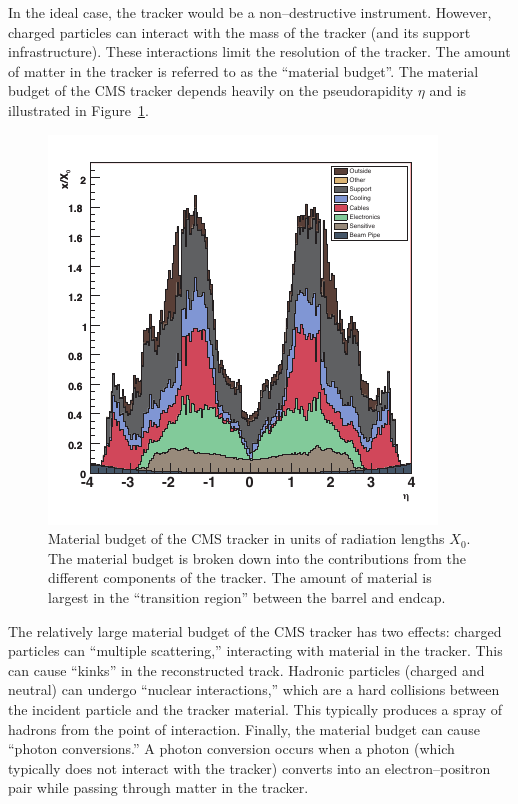 In the ideal case, the tracker would be a non--destructive instrument.  However,
charged particles can interact with the mass of the tracker (and its support
infrastructure).  These interactions limit the resolution of the tracker.  The
amount of matter in the tracker is referred to as the ``material budget''.  The
material budget of the CMS tracker depends heavily on the pseudorapidity $\eta$
and is illustrated in Figure~\ref{fig:TrackerMaterialBudget}.
\begin{figure}
  \centering
  \includegraphics[]{detector_chapter/figures/tracker_material_budget_cleaned.pdf}
  \caption[Material budget of the CMS tracker]{Material budget of the CMS
  tracker in units of radiation lengths $X_0$.  The material budget is broken down
  into the contributions from the different components of the tracker.  The
  amount of material is largest in the ``transition region'' between the barrel
  and endcap.  } \label{fig:TrackerMaterialBudget}
\end{figure}
The relatively large material budget of the CMS tracker has two effects: charged
particles can ``multiple scattering,'' interacting with material in the
tracker.  This can cause ``kinks'' in the reconstructed track.   Hadronic
particles (charged and neutral) can undergo ``nuclear interactions,'' which are
a hard collisions between the incident particle and the tracker material. This
typically produces a spray of hadrons from the point of interaction.  Finally,
the material budget can cause ``photon conversions.''  A photon conversion
occurs when a photon (which typically does not interact with the tracker)
converts into an electron--positron pair while passing through matter in the
tracker.  

